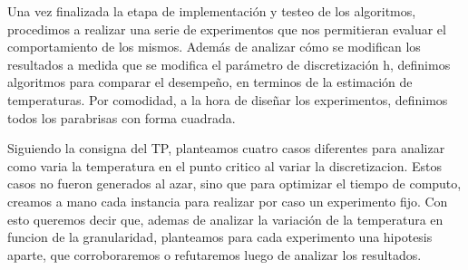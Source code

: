 Una vez finalizada la etapa de implementaci\'on y testeo de los algoritmos, procedimos a realizar una
serie de experimentos que nos permitieran evaluar el comportamiento de los mismos. Adem\'as de
analizar c\'omo se modifican los resultados a medida que se modifica el par\'ametro de discretizaci\'on
h, definimos algoritmos para comparar el desempe\~no, en terminos de la estimaci\'on de temperaturas.
Por comodidad, a la hora de dise\~nar los experimentos, definimos todos los parabrisas con forma cuadrada.

Siguiendo la consigna del TP, planteamos cuatro casos diferentes para analizar como varia la temperatura 
en el punto critico al variar la discretizacion. Estos casos no fueron
generados al azar, sino que para optimizar el tiempo de computo, creamos a mano cada instancia para 
realizar por caso un experimento fijo. Con esto queremos decir que, ademas de 
analizar la variaci\'on de la temperatura en funcion de la granularidad, planteamos para cada experimento 
una hipotesis aparte, que corroboraremos o 
refutaremos luego de analizar los resultados.



